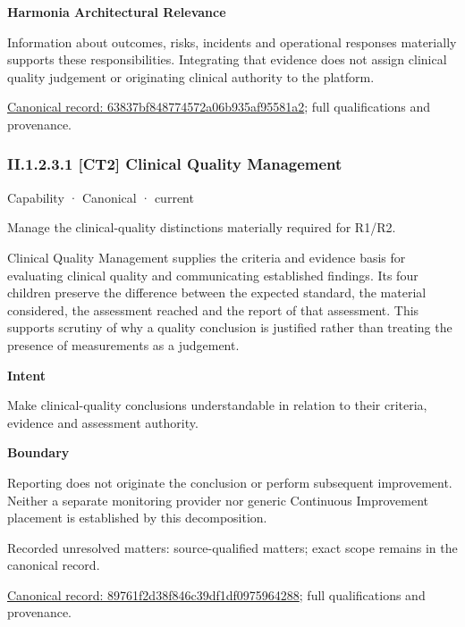 \textbf{Harmonia Architectural Relevance}



Information about outcomes, risks, incidents and operational responses materially supports these responsibilities. Integrating that evidence does not assign clinical quality judgement or originating clinical authority to the platform.


{\footnotesize \href{../../../../continuum/strategy/capability/63837bf848774572a06b935af95581a2.md}{Canonical record: 63837bf848774572a06b935af95581a2}; full qualifications and provenance.}\par
\subsubsection*{II.1.2.3.1 [CT2] Clinical Quality Management}
\label{navigation:II.1.2.3.1}

\label{element:89761f2d38f846c39df1df0975964288}
{\small Capability · Canonical · current}\par

Manage the clinical-quality distinctions materially required for R1/R2.



Clinical Quality Management supplies the criteria and evidence basis for evaluating clinical quality and communicating established findings. Its four children preserve the difference between the expected standard, the material considered, the assessment reached and the report of that assessment. This supports scrutiny of why a quality conclusion is justified rather than treating the presence of measurements as a judgement.



\textbf{Intent}



Make clinical-quality conclusions understandable in relation to their criteria, evidence and assessment authority.



\textbf{Boundary}



Reporting does not originate the conclusion or perform subsequent improvement. Neither a separate monitoring provider nor generic Continuous Improvement placement is established by this decomposition.


{\small Recorded unresolved matters: source-qualified matters; exact scope remains in the canonical record.}\par
{\footnotesize \href{../../../../continuum/strategy/capability/89761f2d38f846c39df1df0975964288.md}{Canonical record: 89761f2d38f846c39df1df0975964288}; full qualifications and provenance.}\par
